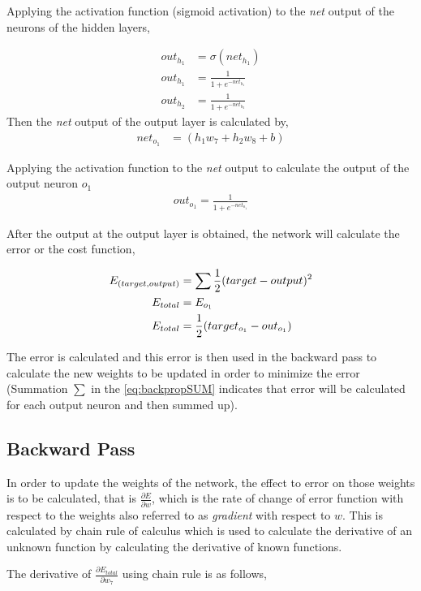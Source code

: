 Applying the activation function (sigmoid activation) to the \textit{net} output of the neurons of the hidden layers,

\begin{align}
    out_{h_{1}} &= \sigma (net_{h_{1}})\\
    out_{h_{1}} &= \frac{1}{1+e^{-net_{h_{1}}}}\\
    out_{h_{2}} &= \frac{1}{1+e^{-net_{h_{2}}}}
\end{align}
Then the \textit{net} output of the output layer is calculated by,
\begin{align}
    net_{o_{1}} &= (h_{1}w_{7}+h_{2}w_{8}+b)
\end{align}

Applying the activation function to the \textit{net} output to calculate the output of the output neuron $o_{1}$
\begin{align}
    out_{o_{1}} = \frac{1}{1+e^{-net_{o_{1}}}}
\end{align}

After the output at the output layer is obtained, the network will calculate the error or the cost function,

\begin{align}
    E_{\text(target, output)} &= \sum\frac{1}{2}(target-output)^2 \label{eq:backpropSUM} \\
    E_{total} &= E_{o_{1}} \\
    E_{total} &= \frac{1}{2}(target_{o_{1}}-out_{o_{1}})  
\end{align}

The error is calculated and this error is then used in the backward pass to calculate the new weights to be updated in order to minimize the error (Summation $\sum$ in the \ref{eq:backpropSUM} indicates that error will be calculated for each output neuron and then summed up).

\subsection*{Backward Pass}
In order to update the weights of the network, the effect to error on those weights is to be calculated, that is $\frac{\partial E}{\partial w}$, which is the rate of change of error function with respect to the weights also referred to as \textit{gradient} with respect to $w$. This is calculated by chain rule of calculus which is used to calculate the derivative of an unknown function by calculating the derivative of known functions.

The derivative of $\frac{\partial E_{total}}{\partial w_{7}}$ using chain rule is as follows,

